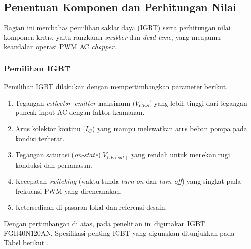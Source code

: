\subsection{Penentuan Komponen dan Perhitungan Nilai}
\label{sec:penentuan-komponen}

Bagian ini membahas pemilihan saklar daya (IGBT) serta perhitungan
nilai komponen kritis, yaitu rangkaian \emph{snubber} dan \emph{dead
time}, yang menjamin keandalan operasi PWM AC \emph{chopper}.

\subsubsection{Pemilihan IGBT}
\label{sec:pemilihan-igbt}

Pemilihan IGBT dilakukan dengan mempertimbangkan parameter berikut.
\begin{enumerate}
  \item Tegangan \emph{collector--emitter} maksimum ($V_{CES}$) yang
        lebih tinggi dari tegangan puncak input AC dengan faktor
        keamanan.
  \item Arus kolektor kontinu ($I_C$) yang mampu melewatkan arus beban
        pompa pada kondisi terberat.
  \item Tegangan saturasi (\emph{on-state}) $V_{CE(sat)}$ yang rendah
        untuk menekan rugi konduksi dan pemanasan.
  \item Kecepatan \emph{switching} (waktu tunda \emph{turn-on} dan
        \emph{turn-off}) yang singkat pada frekuensi PWM yang
        direncanakan.
  \item Ketersediaan di pasaran lokal dan referensi desain.
\end{enumerate}

Dengan pertimbangan di atas, pada penelitian ini digunakan IGBT
FGH40N120AN. Spesifikasi penting IGBT yang digunakan
ditunjukkan pada Tabel berikut \parencite{fairchild_fgh40n120an}.


